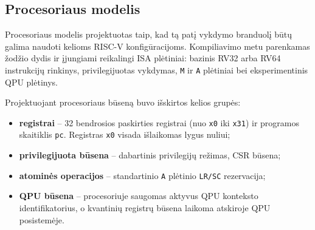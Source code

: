 \subsection{Procesoriaus modelis}
\label{sec:procesoriaus-modelis}

Procesoriaus modelis projektuotas taip, kad tą patį vykdymo branduolį būtų galima naudoti kelioms RISC-V konfigūracijoms. Kompiliavimo metu parenkamas žodžio dydis ir įjungiami reikalingi ISA plėtiniai: bazinis RV32 arba RV64 instrukcijų rinkinys, privilegijuotas vykdymas, \texttt{M} ir \texttt{A} plėtiniai bei eksperimentinis QPU plėtinys.

Projektuojant procesoriaus būseną buvo išskirtos kelios grupės:

\begin{itemize}
    \item \textbf{registrai} -- 32 bendrosios paskirties registrai (nuo \texttt{x0} iki \texttt{x31}) ir programos skaitiklis \texttt{pc}. Registras \texttt{x0} visada išlaikomas lygus nuliui;
    \item \textbf{privilegijuota būsena} -- dabartinis privilegijų režimas, CSR būsena; 
    \item \textbf{atominės operacijos} -- standartinio \texttt{A} plėtinio \texttt{LR/SC} rezervacija;
    \item \textbf{QPU būsena} -- procesoriuje saugomas aktyvus QPU konteksto identifikatorius, o kvantinių registrų būsena laikoma atskiroje QPU posistemėje.
\end{itemize}
